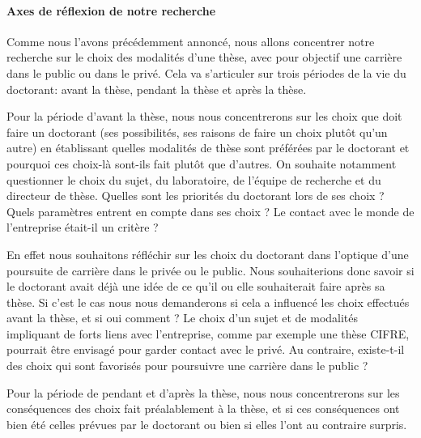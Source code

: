 \documentclass[12pt]{article}
\begin{document}


\paragraph{Axes de réflexion de notre recherche}

Comme nous l'avons précédemment annoncé, nous allons concentrer notre recherche sur le choix des modalités d'une thèse, avec pour objectif une carrière dans le public ou dans le privé. Cela va s'articuler sur trois périodes de la vie du doctorant: avant la thèse, pendant la thèse et après la thèse.

Pour la période d'avant la thèse, nous nous concentrerons sur les choix que doit faire un doctorant (ses possibilités, ses raisons de faire un choix plutôt qu'un autre) en établissant quelles modalités de thèse sont préférées par le doctorant et pourquoi ces choix-là sont-ils fait plutôt que d'autres.
On souhaite notamment questionner le choix du sujet, du laboratoire, de l'équipe de recherche et du directeur de thèse. Quelles sont les priorités du doctorant lors de ses choix ? Quels paramètres entrent en compte dans ses choix ? Le contact avec le monde de l'entreprise était-il un critère ?

En effet nous souhaitons réfléchir sur les choix du doctorant dans l'optique d'une poursuite de carrière dans le privée ou le public. Nous souhaiterions donc savoir si le doctorant avait déjà une idée de ce qu'il ou elle souhaiterait faire après sa thèse. Si c'est le cas nous nous demanderons si cela a influencé les choix effectués avant la thèse, et si oui comment ? Le choix d'un sujet et de modalités impliquant de forts liens avec l'entreprise, comme par exemple une thèse CIFRE, pourrait être envisagé pour garder contact avec le privé. Au contraire, existe-t-il des choix qui sont favorisés pour poursuivre une carrière dans le public ?

Pour la période de pendant et d'après la thèse, nous nous concentrerons sur les conséquences des choix fait préalablement à la thèse, et si ces conséquences ont bien été celles prévues par le doctorant ou bien si elles l'ont au contraire surpris.
\end{document}
